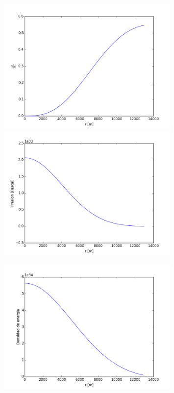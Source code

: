 \documentclass[11pt,a4paper]{article}
\begin{document}
\begin{figure}[!ht]
\begin{center}
\includegraphics[width=0.8\textwidth]{Radio_masa.png}
\includegraphics[width=0.8\textwidth]{Radio_presion.png}

\end{center}
\end{figure}

\newpage


\begin{figure}[!ht]
\begin{center}
\includegraphics[width=0.8\textwidth]{Radio_energia.png}
\end{center}
\end{figure}
\end{document}
